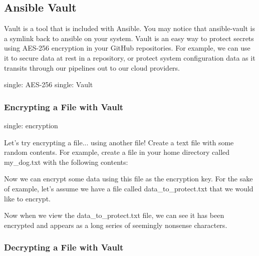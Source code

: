 \hypertarget{ansible-vault}{%
\subsection{Ansible Vault}\label{ansible-vault}}

Vault is a tool that is included with Ansible. You may notice that
ansible-vault is a symlink back to ansible on your system. Vault is an
easy way to protect secrets using AES-256 encryption in your GitHub
repositories. For example, we can use it to secure data at rest in a
repository, or protect system configuration data as it transits through
our pipelines out to our cloud providers.

single: AES-256 single: Vault

\hypertarget{encrypting-a-file-with-vault}{%
\subsubsection{Encrypting a File with
Vault}\label{encrypting-a-file-with-vault}}

single: encryption

Let's try encrypting a file... using another file! Create a text file
with some random contents. For example, create a file in your home
directory called my\_dog.txt with the following contents:

\begin{Shaded}
\begin{Highlighting}[]
\end{Highlighting}
\end{Shaded}

Now we can encrypt some data using this file as the encryption key. For
the sake of example, let's assume we have a file called
data\_to\_protect.txt that we would like to encrypt.

\begin{Shaded}
\begin{Highlighting}[]
\end{Highlighting}
\end{Shaded}

Now when we view the data\_to\_protect.txt file, we can see it has been
encrypted and appears as a long series of seemingly nonsense characters.

\hypertarget{decrypting-a-file-with-vault}{%
\subsubsection{Decrypting a File with
Vault}\label{decrypting-a-file-with-vault}}

